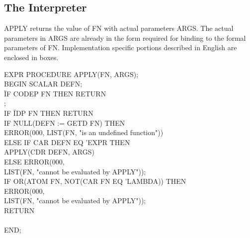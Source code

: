 \subsection{The Interpreter}
\label{interpreter}
{APPLY returns the value of FN with actual parameters ARGS. The actual
parameters in ARGS are already in the form required for binding to the
formal parameters of FN. Implementation specific portions described in
English are enclosed in boxes.

{\tt \begin{tabbing} EXPR PROCEDURE APPLY(FN, ARGS); \\ BEGIN SCALAR
DEFN; \\
\hspace*{2em}\= IF CODEP FN THEN RETURN \\
\> \hspace{1em} ; \\
\> IF \= IDP FN THEN RETURN \\
\> \> IF \= NULL(DEFN := GETD FN) THEN \\
\> \> \> ERROR(000, LIST(FN, "is an undefined function")) \\
\> \> ELSE IF CAR DEFN EQ 'EXPR THEN \\
\> \> \> APPLY(CDR DEFN, ARGS) \\
\> \> ELSE ERROR(000, \\
\> \> \> LIST(FN, "cannot be evaluated by APPLY")); \\
\> IF OR(ATOM FN, NOT(CAR FN EQ 'LAMBDA)) THEN \\
\> \> ERROR(000, \\
\> \> LIST(FN, "cannot be evaluated by APPLY")); \\
\> RETURN \\
\> \>  \\ END;
\end{tabbing}}}

